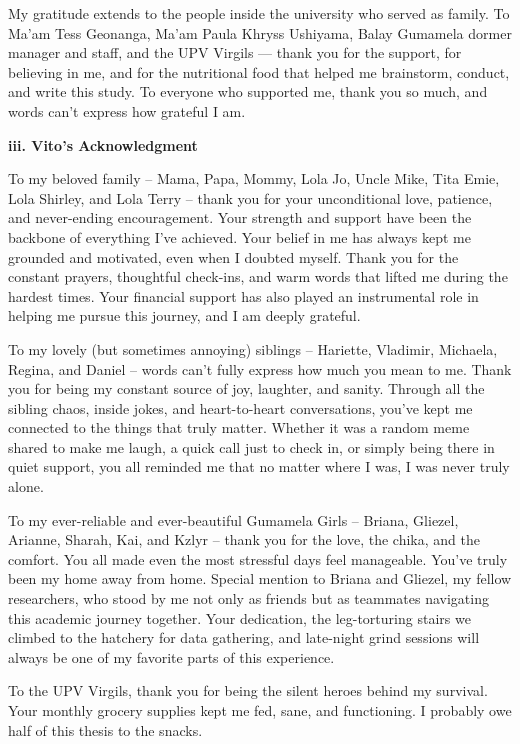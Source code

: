 My gratitude extends to the people inside the university who served as family. To Ma’am Tess Geonanga, Ma’am Paula Khryss Ushiyama, Balay Gumamela dormer manager and staff, and the UPV Virgils — thank you for the support, for believing in me, and for the nutritional food that helped me brainstorm, conduct, and write this study.
To everyone who supported me, thank you so much, and words can’t express how grateful I am.

\vspace{0.5cm}
\noindent\textbf{iii. Vito's Acknowledgment} \\
\vspace{-0.5cm}

To my beloved family – Mama, Papa, Mommy, Lola Jo, Uncle Mike, Tita Emie, Lola Shirley, and Lola Terry – thank you for your unconditional love, patience, and never-ending encouragement. Your strength and support have been the backbone of everything I’ve achieved. Your belief in me has always kept me grounded and motivated, even when I doubted myself. Thank you for the constant prayers, thoughtful check-ins, and warm words that lifted me during the hardest times. Your financial support has also played an instrumental role in helping me pursue this journey, and I am deeply grateful.

To my lovely (but sometimes annoying) siblings – Hariette, Vladimir, Michaela, Regina, and Daniel – words can’t fully express how much you mean to me. Thank you for being my constant source of joy, laughter, and sanity. Through all the sibling chaos, inside jokes, and heart-to-heart conversations, you've kept me connected to the things that truly matter. Whether it was a random meme shared to make me laugh, a quick call just to check in, or simply being there in quiet support, you all reminded me that no matter where I was, I was never truly alone.

To my ever-reliable and ever-beautiful Gumamela Girls – Briana, Gliezel, Arianne, Sharah, Kai, and Kzlyr – thank you for the love, the chika, and the comfort. You all made even the most stressful days feel manageable. You’ve truly been my home away from home. Special mention to Briana and Gliezel, my fellow researchers, who stood by me not only as friends but as teammates navigating this academic journey together. Your dedication, the leg-torturing stairs we climbed to the hatchery for data gathering, and late-night grind sessions will always be one of my favorite parts of this experience.

To the UPV Virgils, thank you for being the silent heroes behind my survival. Your monthly grocery supplies kept me fed, sane, and functioning. I probably owe half of this thesis to the snacks.

